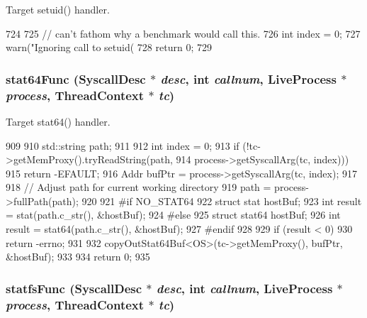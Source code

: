 Target setuid() handler. 


\begin{DoxyCode}
724 {
725     // can't fathom why a benchmark would call this.
726     int index = 0;
727     warn("Ignoring call to setuid(%
728     return 0;
729 }
\end{DoxyCode}
\hypertarget{syscall__emul_8hh_a03ce27f716fe9fc0eb250d09c1ff1683}{
\subsubsection[{stat64Func}]{ stat64Func ({\bf SyscallDesc} $\ast$ {\em desc}, \/  int {\em callnum}, \/  {\bf LiveProcess} $\ast$ {\em process}, \/  {\bf ThreadContext} $\ast$ {\em tc})}}
\label{syscall__emul_8hh_a03ce27f716fe9fc0eb250d09c1ff1683}


Target stat64() handler. 


\begin{DoxyCode}
909 {
910     std::string path;
911 
912     int index = 0;
913     if (!tc->getMemProxy().tryReadString(path,
914                 process->getSyscallArg(tc, index)))
915         return -EFAULT;
916     Addr bufPtr = process->getSyscallArg(tc, index);
917 
918     // Adjust path for current working directory
919     path = process->fullPath(path);
920 
921 #if NO_STAT64
922     struct stat  hostBuf;
923     int result = stat(path.c_str(), &hostBuf);
924 #else
925     struct stat64 hostBuf;
926     int result = stat64(path.c_str(), &hostBuf);
927 #endif
928 
929     if (result < 0)
930         return -errno;
931 
932     copyOutStat64Buf<OS>(tc->getMemProxy(), bufPtr, &hostBuf);
933 
934     return 0;
935 }
\end{DoxyCode}
\hypertarget{syscall__emul_8hh_aeeffeafdf73963270562a90525eeef65}{
\subsubsection[{statfsFunc}]{ statfsFunc ({\bf SyscallDesc} $\ast$ {\em desc}, \/  int {\em callnum}, \/  {\bf LiveProcess} $\ast$ {\em process}, \/  {\bf ThreadContext} $\ast$ {\em tc})}}
\label{syscall__emul_8hh_aeeffeafdf73963270562a90525eeef65}


